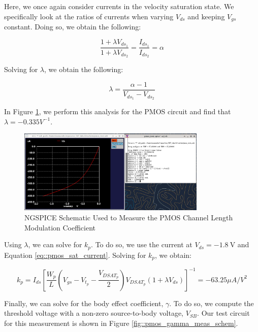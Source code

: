 \documentclass[fleqn]{article}
\begin{document}
	\noindent Here, we once again consider currents in the velocity saturation state. We specifically look at the ratios of currents when varying $V_{ds}$ and keeping $V_{gs}$ constant. Doing so, we obtain the following:
	
	\begin{equation}
		\frac{1 + {\lambda}V_{ds_1}}{1 + {\lambda}V_{ds_2}} = \frac{I_{ds_1}}{I_{ds_2}} = \alpha
	\end{equation}
	
	\noindent Solving for $\lambda$, we obtain the following:
	
	\begin{equation}
		\lambda = \frac{\alpha - 1}{V_{ds_1} - V_{ds_2}}
	\end{equation}
	
	\noindent In Figure \ref{fig::pmos_lambda_meas}, we perform this analysis for the PMOS circuit and find that $\lambda = -0.335 V^{-1}$.
	
	\begin{figure}[H]
		\centerline{\includegraphics[width=0.8\textwidth]{pmos_lambda_meas.png}}
		\caption{NGSPICE Schematic Used to Measure the PMOS Channel Length Modulation Coefficient}
		\label{fig::pmos_lambda_meas}
	\end{figure}
	
	\noindent Using $\lambda$, we can solve for $k_p$. To do so, we use the current at $V_{ds}=-1.8\ \text{V}$ and Equation \ref{eq::pmos_sat_current}. Solving for $k_p$, we obtain:
	
	\begin{equation}
		k_p = I_{ds}\left[\frac{W_p}{L}\left(V_{gs} - V_{t_p} - \frac{V_{DSAT_p}}{2}\right)V_{DSAT_p}(1 + {\lambda}V_{ds})\right]^{-1} = -63.25 {\mu}A/V^2
	\end{equation}
	
	Finally, we can solve for the body effect coefficient, $\gamma$. To do so, we compute the threshold voltage with a non-zero source-to-body voltage, $V_{SB}$. Our test circuit for this measurement is shown in Figure \ref{fig::pmos_gamma_meas_schem}.
	
\end{document}
